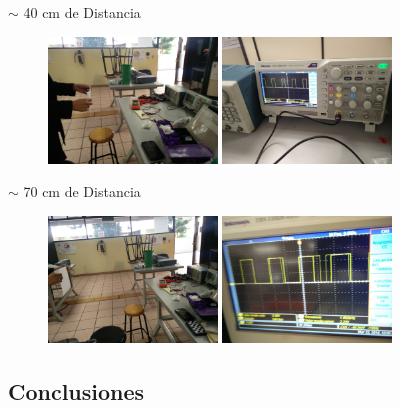 \documentclass[12pt, fleqn]{article}                            %
\theoremstyle{break}                                            %
\begin{document}
        $\sim$ 40 cm de Distancia
        \begin{figure}[h]
            \includegraphics[width=0.4\textwidth]{6Distance}
            \includegraphics[width=0.4\textwidth]{6Signal}
        \end{figure}

        $\sim$ 70 cm de Distancia
        \begin{figure}[h]
            \includegraphics[width=0.4\textwidth]{2Distance}
            \includegraphics[width=0.4\textwidth]{2Signal}
        \end{figure}




    \clearpage
    \subsection{Conclusiones} 
\end{document}
